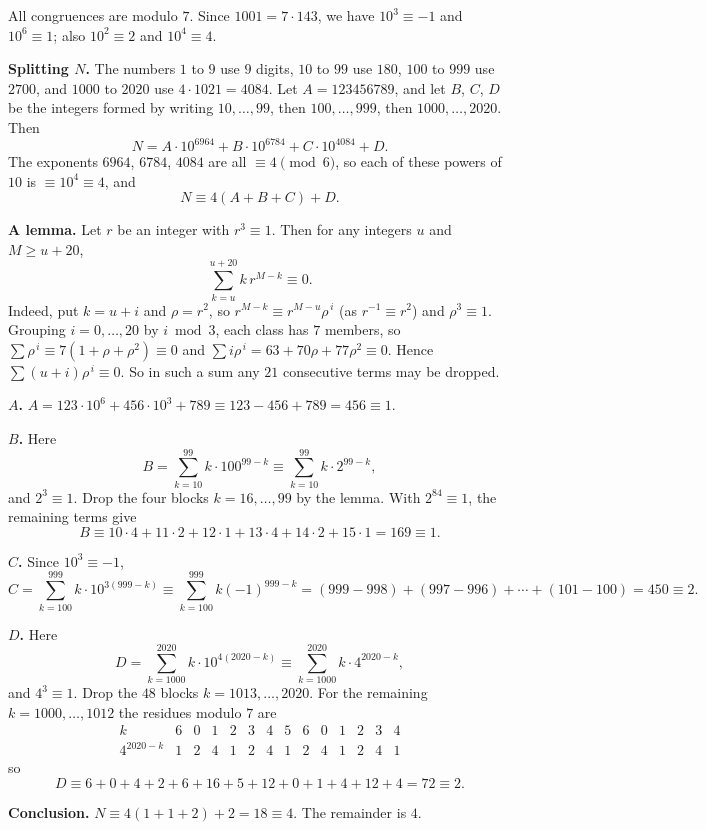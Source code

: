 All congruences are modulo $7$. Since $1001=7\cdot143$, we have $10^3\equiv-1$ and $10^6\equiv1$; also $10^2\equiv2$ and $10^4\equiv4$.

\textbf{Splitting $N$.} The numbers $1$ to $9$ use $9$ digits, $10$ to $99$ use $180$, $100$ to $999$ use $2700$, and $1000$ to $2020$ use $4\cdot1021=4084$. Let $A=123456789$, and let $B$, $C$, $D$ be the integers formed by writing $10,\dots,99$, then $100,\dots,999$, then $1000,\dots,2020$. Then
\[
N=A\cdot10^{6964}+B\cdot10^{6784}+C\cdot10^{4084}+D .
\]
The exponents $6964$, $6784$, $4084$ are all $\equiv4\pmod6$, so each of these powers of $10$ is $\equiv10^4\equiv4$, and
\[
N\equiv4(A+B+C)+D .
\]

\textbf{A lemma.} Let $r$ be an integer with $r^3\equiv1$. Then for any integers $u$ and $M\ge u+20$,
\[
\sum_{k=u}^{u+20}k\,r^{M-k}\equiv0 .
\]
Indeed, put $k=u+i$ and $\rho=r^2$, so $r^{M-k}\equiv r^{M-u}\rho^{\,i}$ (as $r^{-1}\equiv r^2$) and $\rho^3\equiv1$. Grouping $i=0,\dots,20$ by $i\bmod3$, each class has $7$ members, so $\sum\rho^{\,i}\equiv7\left(1+\rho+\rho^2\right)\equiv0$ and $\sum i\rho^{\,i}=63+70\rho+77\rho^2\equiv0$. Hence $\sum(u+i)\rho^{\,i}\equiv0$. So in such a sum any $21$ consecutive terms may be dropped.

\textbf{$A$.} $A=123\cdot10^6+456\cdot10^3+789\equiv123-456+789=456\equiv1$.

\textbf{$B$.} Here
\[
B=\sum_{k=10}^{99}k\cdot100^{99-k}\equiv\sum_{k=10}^{99}k\cdot2^{99-k},
\]
and $2^3\equiv1$. Drop the four blocks $k=16,\dots,99$ by the lemma. With $2^{84}\equiv1$, the remaining terms give
\[
B\equiv10\cdot4+11\cdot2+12\cdot1+13\cdot4+14\cdot2+15\cdot1=169\equiv1 .
\]

\textbf{$C$.} Since $10^3\equiv-1$,
\[
C=\sum_{k=100}^{999}k\cdot10^{3(999-k)}\equiv\sum_{k=100}^{999}k(-1)^{999-k}=(999-998)+(997-996)+\cdots+(101-100)=450\equiv2 .
\]

\textbf{$D$.} Here
\[
D=\sum_{k=1000}^{2020}k\cdot10^{4(2020-k)}\equiv\sum_{k=1000}^{2020}k\cdot4^{2020-k},
\]
and $4^3\equiv1$. Drop the $48$ blocks $k=1013,\dots,2020$. For the remaining $k=1000,\dots,1012$ the residues modulo $7$ are
\[
\begin{array}{c|ccccccccccccc}
k & 6&0&1&2&3&4&5&6&0&1&2&3&4\\ \hline
4^{2020-k} & 1&2&4&1&2&4&1&2&4&1&2&4&1
\end{array}
\]
so
\[
D\equiv6+0+4+2+6+16+5+12+0+1+4+12+4=72\equiv2 .
\]

\textbf{Conclusion.} $N\equiv4(1+1+2)+2=18\equiv4$. The remainder is $\boxed{4}$.
